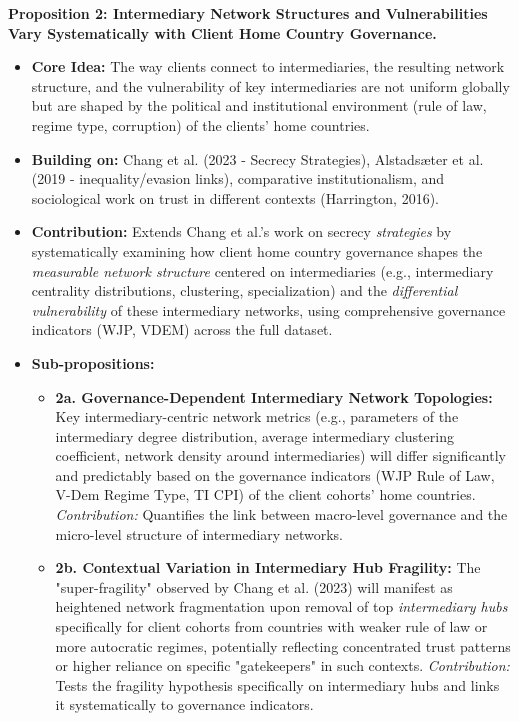 \textbf{Proposition 2: Intermediary Network Structures and Vulnerabilities Vary Systematically with Client Home Country Governance.}
\begin{itemize}[leftmargin=*]
    \item \textbf{Core Idea:} The way clients connect to intermediaries, the resulting network structure, and the vulnerability of key intermediaries are not uniform globally but are shaped by the political and institutional environment (rule of law, regime type, corruption) of the clients' home countries.
    \item \textbf{Building on:} Chang et al. (2023 - Secrecy Strategies), Alstadsæter et al. (2019 - inequality/evasion links), comparative institutionalism, and sociological work on trust in different contexts (Harrington, 2016).
    \item \textbf{Contribution:} Extends Chang et al.'s work on secrecy \textit{strategies} by systematically examining how client home country governance shapes the \textit{measurable network structure} centered on intermediaries (e.g., intermediary centrality distributions, clustering, specialization) and the \textit{differential vulnerability} of these intermediary networks, using comprehensive governance indicators (WJP, VDEM) across the full dataset.
    \item \textbf{Sub-propositions:}
    \begin{itemize}[leftmargin=\parindent]
        \item \textbf{2a. Governance-Dependent Intermediary Network Topologies:} Key intermediary-centric network metrics (e.g., parameters of the intermediary degree distribution, average intermediary clustering coefficient, network density around intermediaries) will differ significantly and predictably based on the governance indicators (WJP Rule of Law, V-Dem Regime Type, TI CPI) of the client cohorts' home countries. \textit{Contribution:} Quantifies the link between macro-level governance and the micro-level structure of intermediary networks.
        \item \textbf{2b. Contextual Variation in Intermediary Hub Fragility:} The "super-fragility" observed by Chang et al. (2023) will manifest as heightened network fragmentation upon removal of top \textit{intermediary hubs} specifically for client cohorts from countries with weaker rule of law or more autocratic regimes, potentially reflecting concentrated trust patterns or higher reliance on specific "gatekeepers" in such contexts. \textit{Contribution:} Tests the fragility hypothesis specifically on intermediary hubs and links it systematically to governance indicators.

\end{itemize}
\end{itemize}
